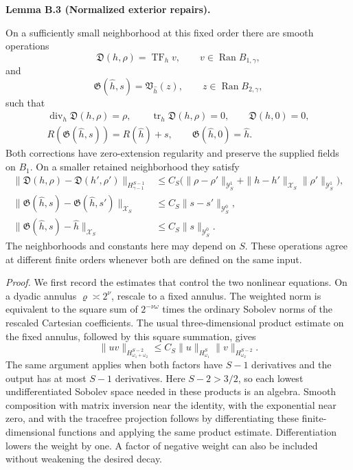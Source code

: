 \documentclass[
  english,
  11pt,
  reqno]{amsart}
\makeatletter
\newcommand{\pandocstatementheading}[1]{%
  \par\if@nobreak\else
    \addpenalty{\@beginparpenalty}%
    \addvspace{.5\baselineskip plus .2\baselineskip minus .2\baselineskip}%
  \fi
  {\normalfont\bfseries #1\par}%
  \nobreak\@afterindenttrue\@afterheading
}
\makeatother
\begin{document}
\pandocstatementheading{\leavevmode{}\label{lem:online-extension-normalized-repairs}Lemma B.3 (Normalized exterior repairs).}

On a sufficiently small neighborhood at this fixed order there are
smooth operations \[
\mathfrak D(h,\rho)=\operatorname{TF}_h v,\qquad
v\in\operatorname{Ran}B_{1,\gamma},
\] and \[
\mathfrak G(\widehat h,s)
=\mathfrak V_{\widehat h}(z),\qquad
z\in\operatorname{Ran}B_{2,\gamma},
\] such that \[
\begin{gathered}
\operatorname{div}_h\mathfrak D(h,\rho)=\rho,\qquad
\operatorname{tr}_h\mathfrak D(h,\rho)=0,\qquad
\mathfrak D(h,0)=0,\\
R(\mathfrak G(\widehat h,s))=R(\widehat h)+s,\qquad
\mathfrak G(\widehat h,0)=\widehat h.
\end{gathered}
\] Both corrections have zero-extension regularity and preserve the
supplied fields on \(B_1\). On a smaller retained neighborhood they
satisfy \[
\begin{aligned}
\|\mathfrak D(h,\rho)-\mathfrak D(h',\rho')\|_{H^{S-1}_{\gamma-1}}
&\le C_S\bigl(
\|\rho-\rho'\|_{\mathcal Y_S^1}
+\|h-h'\|_{\mathcal X_S}\|\rho'\|_{\mathcal Y_S^1}\bigr),\\
\|\mathfrak G(\widehat h,s)-\mathfrak G(\widehat h,s')\|_{\mathcal X_S}
&\le C_S\|s-s'\|_{\mathcal Y_S^0},\\
\|\mathfrak G(\widehat h,s)-\widehat h\|_{\mathcal X_S}
&\le C_S\|s\|_{\mathcal Y_S^0}.
\end{aligned}
\] The neighborhoods and constants here may depend on \(S\). These
operations agree at different finite orders whenever both are defined on
the same input.

\emph{Proof.} We first record the estimates that control the two
nonlinear equations. On a dyadic annulus \(\varrho\asymp 2^\nu\),
rescale to a fixed annulus. The weighted norm is equivalent to the
square sum of \(2^{-\nu\omega}\) times the ordinary Sobolev norms of the
rescaled Cartesian coefficients. The usual three-dimensional product
estimate on the fixed annulus, followed by this square summation, gives
\[
\|uv\|_{H^{S-2}_{\omega_1+\omega_2}}
\le C_S\|u\|_{H^S_{\omega_1}}
\|v\|_{H^{S-2}_{\omega_2}}.
\] The same argument applies when both factors have \(S-1\) derivatives
and the output has at most \(S-1\) derivatives. Here \(S-2>3/2\), so
each lowest undifferentiated Sobolev space needed in these products is
an algebra. Smooth composition with matrix inversion near the identity,
with the exponential near zero, and with the tracefree projection
follows by differentiating these finite-dimensional functions and
applying the same product estimate. Differentiation lowers the weight by
one. A factor of negative weight can also be included without weakening
the desired decay.
\end{document}
